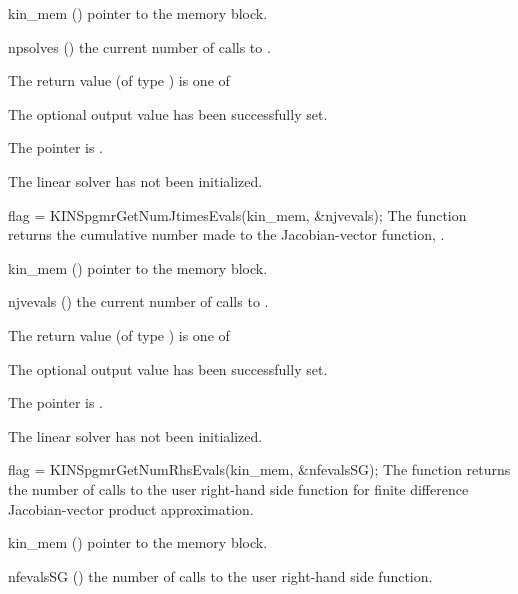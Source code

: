 {
  \begin{args}
  \item[kin\_mem] ()
    pointer to the {\kinsol} memory block.
  \item[npsolves] ()
    the current number of calls to .
  \end{args}
}
{
  The return value  (of type ) is one of
  \begin{args}
  \item[\Id{KINSPGMR\_SUCCESS}] 
    The optional output value has been successfully set.
  \item[\Id{KINSPGMR\_MEM\_NULL}]
    The  pointer is .
  \item[\Id{KINSPGMR\_LMEM\_NULL}]
    The {\kinspgmr} linear solver has not been initialized.
  \end{args}
}
{}
{
  flag = KINSpgmrGetNumJtimesEvals(kin\_mem, \&njvevals);
}
{
  The function  returns the
  cumulative number made to the Jacobian-vector function,
  .
}
{
  \begin{args}
  \item[kin\_mem] ()
    pointer to the {\kinsol} memory block.
  \item[njvevals] ()
    the current number of calls to .
  \end{args}
}
{
  The return value  (of type ) is one of
  \begin{args}
  \item[\Id{KINSPGMR\_SUCCESS}] 
    The optional output value has been successfully set.
  \item[\Id{KINSPGMR\_MEM\_NULL}]
    The  pointer is .
  \item[\Id{KINSPGMR\_LMEM\_NULL}]
    The {\kinspgmr} linear solver has not been initialized.
  \end{args}
}
{}
{
  flag = KINSpgmrGetNumRhsEvals(kin\_mem, \&nfevalsSG);
}
{
  The function  returns the
  number of calls to the user right-hand side function for
  finite difference Jacobian-vector product approximation.
}
{
  \begin{args}
  \item[kin\_mem] ()
    pointer to the {\kinsol} memory block.
  \item[nfevalsSG] ()
    the number of calls to the user right-hand side function.
  \end{args}
}
